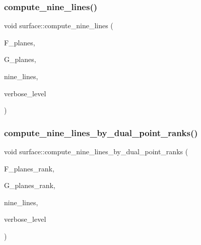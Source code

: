 \subsubsection{\texorpdfstring{compute\+\_\+nine\+\_\+lines()}{compute\_nine\_lines()}}
{\footnotesize\ttfamily void surface\+::compute\+\_\+nine\+\_\+lines (\begin{DoxyParamCaption}\item[{\mbox{\hyperlink{galois_8h_a09fddde158a3a20bd2dcadb609de11dc}{I\+NT}} $\ast$}]{F\+\_\+planes,  }\item[{\mbox{\hyperlink{galois_8h_a09fddde158a3a20bd2dcadb609de11dc}{I\+NT}} $\ast$}]{G\+\_\+planes,  }\item[{\mbox{\hyperlink{galois_8h_a09fddde158a3a20bd2dcadb609de11dc}{I\+NT}} $\ast$}]{nine\+\_\+lines,  }\item[{\mbox{\hyperlink{galois_8h_a09fddde158a3a20bd2dcadb609de11dc}{I\+NT}}}]{verbose\+\_\+level }\end{DoxyParamCaption})}

\mbox{\label{classsurface_aa83b3b78278e3a0846e188a7694beb17}} 
\subsubsection{\texorpdfstring{compute\+\_\+nine\+\_\+lines\+\_\+by\+\_\+dual\+\_\+point\+\_\+ranks()}{compute\_nine\_lines\_by\_dual\_point\_ranks()}}
{\footnotesize\ttfamily void surface\+::compute\+\_\+nine\+\_\+lines\+\_\+by\+\_\+dual\+\_\+point\+\_\+ranks (\begin{DoxyParamCaption}\item[{\mbox{\hyperlink{galois_8h_a09fddde158a3a20bd2dcadb609de11dc}{I\+NT}} $\ast$}]{F\+\_\+planes\+\_\+rank,  }\item[{\mbox{\hyperlink{galois_8h_a09fddde158a3a20bd2dcadb609de11dc}{I\+NT}} $\ast$}]{G\+\_\+planes\+\_\+rank,  }\item[{\mbox{\hyperlink{galois_8h_a09fddde158a3a20bd2dcadb609de11dc}{I\+NT}} $\ast$}]{nine\+\_\+lines,  }\item[{\mbox{\hyperlink{galois_8h_a09fddde158a3a20bd2dcadb609de11dc}{I\+NT}}}]{verbose\+\_\+level }\end{DoxyParamCaption})}

